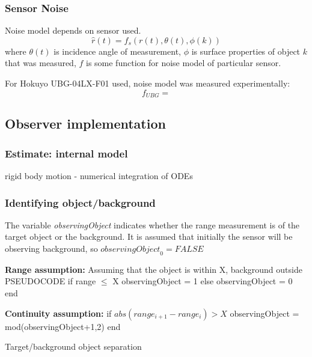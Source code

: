 	\subsubsection{Sensor Noise}
	Noise model depends on sensor used.
	\begin{equation}
		\hat{r}(t) = f_s(r(t),\theta(t),\phi(k))
	\end{equation}
	where $\theta(t)$ is incidence angle of measurement, $\phi$ is surface properties of object $k$ that was measured, $f$ is some function for noise model of particular sensor.
	
	For Hokuyo UBG-04LX-F01 used, noise model was measured experimentally:
	\begin{equation}
		f_{UBG} = 
	\end{equation}
	
	
\subsection{Observer implementation}
	\subsubsection{Estimate: internal model}
		rigid body motion - numerical integration of ODEs
	
	\subsubsection{Identifying object/background}
		The variable \textit{observingObject} indicates whether the range measurement is of the target object or the background. It is assumed that initially the sensor will be observing background, so $\textit{observingObject}_0 = FALSE$

		\textbf{Range assumption:}
		Assuming that the object is within X, background outside
		PSEUDOCODE
		if range $\leq$ X
			observingObject = 1
		else
			observingObject = 0
		end
		
		\textbf{Continuity assumption:}
		if $abs(range_{i+1}-range_i) > X$
			observingObject = mod(observingObject+1,2)
		end
		
		\IncMargin{2em}
		\begin{algorithm}
		\DontPrintSemicolon
	
		\caption{Target/background object separation}
		\end{algorithm}
		
